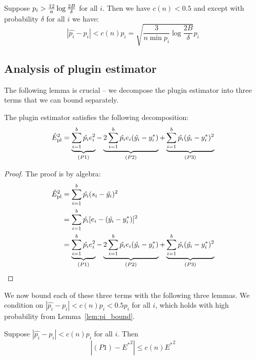 \begin{lemma}
\label{lem:pi_bound}
Suppose $p_i > \frac{12}{n}\log{\frac{2B}{\delta}}{}$ for all $i$. Then we have $c(n) < 0.5$ and except with probability $\delta$ for all $i$ we have:
\[ |\hat{p_i} - p_i| < c(n)p_i = \sqrt{\frac{3}{n \min p_i} \log{\frac{2B}{\delta}}} p_i \]
\end{lemma}

\subsection{Analysis of plugin estimator}


The following lemma is crucial -- we decompose the plugin estimator into three terms that we can bound separately.

\begin{lemma}
\label{lem:plugin_decomp}
The plugin estimator satisfies the following decomposition:
\[ \hat{E}_{\textup{pl}}^2{} = \underbrace{\sum_{i=1}^b \hat{p_i}e_i^2}_{(P1)}  - \underbrace{2\sum_{i=1}^b \hat{p_i}e_i(\hat{y_i} - y_i^*)}_{(P2)} + \underbrace{\sum_{i=1}^b \hat{p_i}(\hat{y_i} - y_i^*)^2}_{(P3)} \]
\end{lemma}

\begin{proof}
The proof is by algebra:
\begin{align*}
\hat{E}_{\textup{pl}}^2{} &= \sum_{i=1}^b \hat{p_i}(s_i - \hat{y_i})^2 \\
&= \sum_{i=1}^b \hat{p_i}[e_i - (\hat{y_i} - y_i^*)]^2 \\
&= \underbrace{\sum_{i=1}^b \hat{p_i}e_i^2}_{(P1)}  - \underbrace{2\sum_{i=1}^b \hat{p_i}e_i(\hat{y_i} - y_i^*)}_{(P2)} + \underbrace{\sum_{i=1}^b \hat{p_i}(\hat{y_i} - y_i^*)^2}_{(P3)}
\end{align*}
\end{proof}

We now bound each of these three terms with the following three lemmas. We condition on $|\hat{p_i} - p_i| < c(n)p_i < 0.5p_i$ for all $i$, which holds with high probability from Lemma~\ref{lem:pi_bound}.

\begin{lemma}[P1]
\label{lem:p1_bound}
Suppose $|\hat{p_i} - p_i| < c(n) p_i$ for all $i$. Then
\[ |(P1) - {E^*}^2| \leq c(n) {E^*}^2 \]
\end{lemma}

